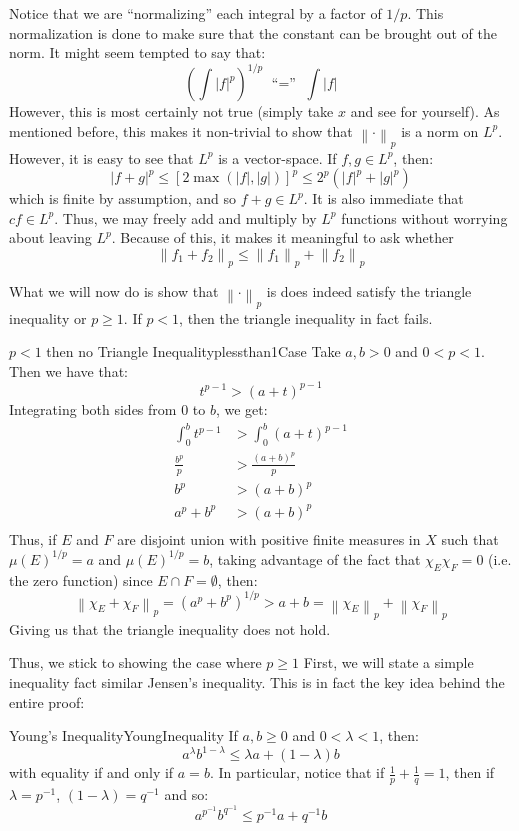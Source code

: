 \documentclass[oneside]{book}
\begin{document}
Notice that we are ``normalizing'' each integral by a factor of $1/p$. This normalization is done to make sure that the
constant can be brought out of the norm. It might seem tempted to say that:
\[
	\left(\int |f|^p\right)^{1/p} \text{ ``$=$'' } \int |f|
\]
However, this is most certainly not true (simply take $x$ and see for yourself). As mentioned before, this makes it
non-trivial to show that $\left\| \cdot\right\|_p$ is a norm on $L^p$. However, it is easy to see that $L^p$ is
a vector-space. If $f,g \in L^p$, then:
\[
	|f+g|^p \le [2\max(|f|, |g|)]^p \le 2^p(|f|^p + |g|^p)
\]
which is finite by assumption, and so $f+g \in L^p$. It is also immediate that $cf \in L^p$. Thus, we may freely add and
multiply by $L^p$ functions without worrying about leaving $L^p$. Because of this, it makes it meaningful to ask whether
\[
	\left\| f_1 +f_2\right\|_p \le \left\| f_1\right\|_p + \left\|f_2\right\|_p
\]

What we will now do is show that $\left\| \cdot \right\|_p$ is does indeed satisfy the triangle inequality or $p \ge 1$.
If $p < 1$, then the triangle inequality in fact fails. 

\begin{example}{$p < 1$ then no Triangle Inequality}{plessthan1Case}
	Take $a, b > 0$ and $0 < p < 1$. Then we have that:
	\[
		t^{p-1} > (a + t)^{p-1}
	\]
	Integrating both sides from $0$ to $b$, we get:
	\begin{align*}
		\int_0^bt^{p-1} &> \int_0^b (a + t)^{p-1}\\
		\frac{b^p}{p} &> \frac{(a+b)^p}{p}\\
		b^p &> (a+b)^p\\
		a^p + b^p &> (a+b)^p\\
	\end{align*}
	Thus, if $E$ and $F$ are disjoint union with positive finite measures in $X$ such that $\mu(E)^{1/p} = a$ and
	$\mu(E)^{1/p} = b$, taking advantage of the fact that $\chi_E\chi_F = 0$ (i.e. the zero function) since $E\cap
	F = \emptyset$, then:
	\[
		\left\| \chi_E + \chi_F\right\|_p = (a^p + b^p)^{1/p} > a+b = \left\| \chi_E\right\|_p + \left\| \chi_F\right\|_p
	\]
	Giving us that the triangle inequality does not hold. 
\end{example}

Thus, we stick to showing the case where $p \ge 1$ First, we will state a simple inequality fact similar Jensen's
inequality. This is in fact the key idea behind the entire proof:
\begin{lem}{Young's Inequality}{YoungInequality}
	If $a,b \ge 0$ and $0 < \lambda < 1$, then:
	\[
		a^\lambda b^{1-\lambda} \le \lambda a + (1-\lambda)b
	\]
	with equality if and only if $a = b$. In particular, notice that if $\frac{1}{p} + \frac{1}{q} = 1$, then if
	$\lambda = p^{-1}$, $(1-\lambda) = q^{-1}$ and so:
	\[
		a^{p^{-1}} b^{q^{-1}} \le p^{-1} a + q^{-1}b
	\]
\end{lem}
\end{document}

